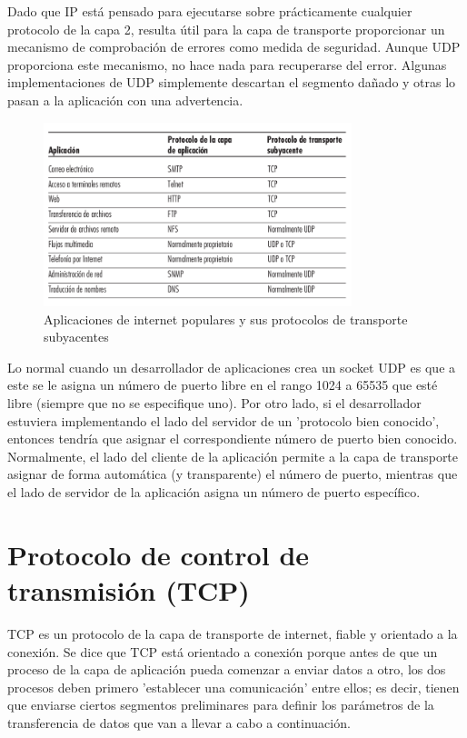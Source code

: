 \documentclass[a4paper,11pt]{article}
\begin{document}
Dado que IP está pensado para ejecutarse sobre prácticamente cualquier protocolo de la capa 2, resulta útil para la capa de transporte proporcionar un mecanismo de comprobación de errores como medida de seguridad. Aunque UDP proporciona este mecanismo, no hace nada para recuperarse del error. Algunas implementaciones de UDP simplemente descartan el segmento dañado y otras lo pasan a la aplicación con una advertencia. \\

\begin{figure}
\centering
\caption{Aplicaciones de internet populares y sus protocolos de transporte subyacentes}
\includegraphics[scale=1,width=0.8\textwidth]{procolos_udp.png}
\end{figure}

Lo normal cuando un desarrollador de aplicaciones crea un socket UDP es que a este se le asigna un número de puerto libre en el rango 1024 a 65535 que esté libre (siempre que no se especifique uno). Por otro lado, si el desarrollador estuviera implementando el lado del servidor de un 'protocolo bien conocido', entonces tendría que asignar el correspondiente número de puerto bien conocido. Normalmente, el lado del cliente de la aplicación permite a la capa de transporte asignar de forma automática (y transparente) el número de puerto, mientras que el lado de servidor de la aplicación asigna un número de puerto específico.

\section{Protocolo de control de transmisión (TCP)}
TCP es un protocolo de la capa de transporte de internet, fiable y orientado a la conexión. Se dice que TCP está orientado a conexión porque antes de que un proceso de la capa de aplicación pueda comenzar a enviar datos a otro, los dos procesos deben primero 'establecer una comunicación' entre ellos; es decir, tienen que enviarse ciertos segmentos preliminares para definir los parámetros de la transferencia de datos que van a llevar a cabo a continuación. \\
\end{document}
